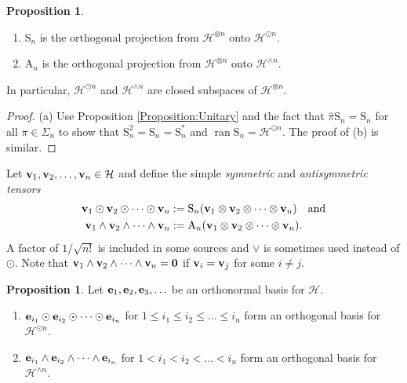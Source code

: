 \documentclass[10pt,reqno]{amsart}
\newcommand{\0}{{\color{lightgray}0}}
\newcommand{\A}{\mathrm{A}}
\renewcommand{\S}{\mathrm{S}}
\renewcommand{\leq}{\leqslant}
\newcommand{\ran}{\operatorname{ran}}
\newcommand{\h}{\mathcal{H}}
\renewcommand{\hat}{\widehat}
\renewcommand{\vec}[1]{{\bf #1}}
\theoremstyle{definition}
\newtheorem{Proposition}[equation]{Proposition}
\numberwithin{equation}{section}
\begin{document}
\begin{Proposition}\label{Proposition:OrthoProj}\hfill
\begin{enumerate}
\item $\S_n$ is the orthogonal projection from $\h^{\otimes n}$ onto $\h^{\odot n}$.
\item $\A_n$ is the orthogonal projection from $\h^{\otimes n}$ onto $\h^{\wedge n}$.
\end{enumerate}
In particular, $\h^{\odot n}$ and $\h^{\wedge n}$ are closed subspaces of $\h^{\otimes n}$.
\end{Proposition}

\begin{proof}
(a) Use Proposition \ref{Proposition:Unitary} and the fact that $\hat{\pi}\S_n = \S_n$ for all $\pi \in \Sigma_n$
to show that $\S_n^2 = \S_n = \S_n^*$ and $\ran \S_n = \h^{\odot n}$.  The proof of (b) is similar.
\end{proof}


Let $\vec{v}_1, \vec{v}_2,\ldots, \vec{v}_n\in \h$ and define the simple \emph{symmetric} and \emph{antisymmetric tensors}
\begin{align*}
\vec{v}_1 \odot \vec{v}_2 \odot \cdots \odot \vec{v}_n
&:=\S_n ( \vec{v}_1 \otimes \vec{v}_2 \otimes \cdots \otimes \vec{v}_n) \quad \text{and}\\
\vec{v}_1 \wedge \vec{v}_2 \wedge \cdots \wedge \vec{v}_n
&:=\A_n ( \vec{v}_1 \otimes \vec{v}_2 \otimes \cdots \otimes \vec{v}_n).
\end{align*}
A factor of $1/\sqrt{n!}$ is included in some sources \cite[(3.8.33)]{SimonReal} and $\vee$ is sometimes used instead of $\odot$.
Note that $\vec{v}_1 \wedge \vec{v}_2 \wedge \cdots \wedge \vec{v}_n = \vec{0}$
if $\vec{v}_i = \vec{v}_j$ for some $i \neq j$.  

\begin{Proposition}\label{Proposition:ONB}
Let $\vec{e}_1, \vec{e}_2, \vec{e}_3,\ldots $ be an orthonormal basis for $\h$. 
\begin{enumerate}
\item $\vec{e}_{i_1} \odot \vec{e}_{i_2} \odot \cdots \odot \vec{e}_{i_n}$ for $1 \leq i_1 \leq i_2 \leq \ldots \leq i_n$
form an orthogonal basis for $\h^{\odot n}$.
\item $\vec{e}_{i_1} \wedge \vec{e}_{i_2} \wedge \cdots \wedge \vec{e}_{i_n}$ for $1 < i_1 < i_2 < \ldots < i_n$
form an orthogonal basis for $\h^{\wedge n}$.
\end{enumerate}
\end{Proposition}
\end{document}
